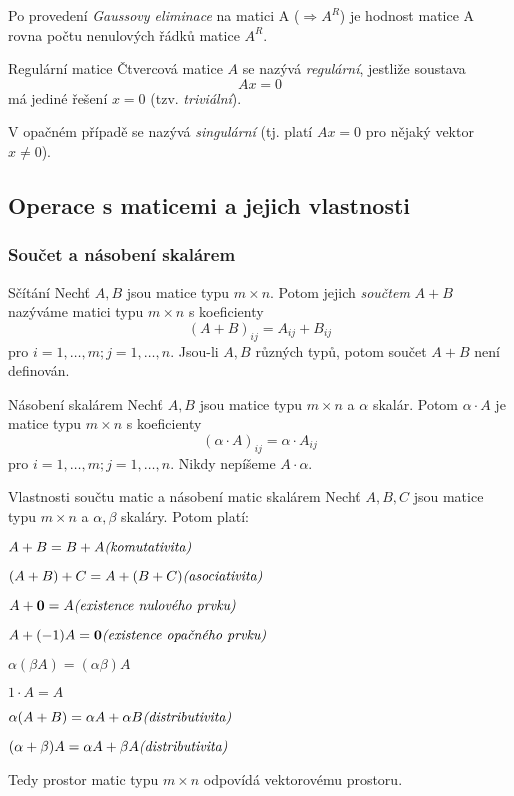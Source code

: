 \begin{poznamka}
Po provedení \emph{Gaussovy eliminace} na matici A ($\Rightarrow A^R$) je hodnost matice A rovna počtu nenulových řádků matice $A^R$.
\end {poznamka}


\begin{definiceN}{Regulární matice}
Čtvercová matice $A$ se nazývá \emph{regulární}, jestliže soustava
$$Ax=0$$
má jediné řešení $x=0$ (tzv. \emph{triviální}).

\medskip\noindent
V opačném případě se nazývá \emph{singulární} (tj. platí $Ax=0$ pro nějaký vektor $x \neq 0$).
\end{definiceN}


\subsection{Operace s maticemi a jejich vlastnosti}

\subsubsection*{Součet a násobení skalárem}

\begin{definiceN}{Sčítání}
Nechť $A,B$ jsou matice typu $m \times n$. Potom jejich \emph{součtem} $A+B$ nazýváme matici typu $m \times n$ s koeficienty $$(A+B)_{ij} = A_{ij} + B_{ij}$$ pro $i=1,\dots,m; j=1,\dots,n$. Jsou-li $A,B$ různých typů, potom součet $A+B$ není definován.
\end{definiceN}

\begin{definiceN}{Násobení skalárem}
Nechť $A,B$ jsou matice typu $m \times n$ a $\alpha$ skalár. Potom $\alpha\cdot A$ je matice typu $m \times n$ s koeficienty $$(\alpha\cdot A)_{ij} = \alpha\cdot A_{ij}$$ pro $i=1,\dots,m; j=1,\dots,n$. Nikdy nepíšeme $A\cdot\alpha$.
\end{definiceN}

\begin{lemmaN}{Vlastnosti součtu matic a násobení matic skalárem}
Nechť $A,B,C$ jsou matice typu $m \times n$ a $\alpha, \beta$ skaláry. Potom platí:
\begin{penumerate}
	\item $A+B=B+A \hfill \textit{(komutativita)}$
	\item $(A+B)+C=A+(B+C) \hfill \textit{(asociativita)}$
	\item $A+\mathbf{0}=A \hfill \textit{(existence nulového prvku)}$
	\item $A+(-1)A=\mathbf{0} \hfill \textit{(existence opačného prvku)}$
	\item $\alpha(\beta A)=(\alpha \beta)A$
	\item $1\cdot A=A$
	\item $\alpha(A+B)=\alpha A + \alpha B \hfill \textit{(distributivita)}$
	\item $(\alpha+\beta)A=\alpha A + \beta A \hfill \textit{(distributivita)}$
\end{penumerate}
Tedy prostor matic typu $m\times n$ odpovídá vektorovému prostoru.
\end{lemmaN}

